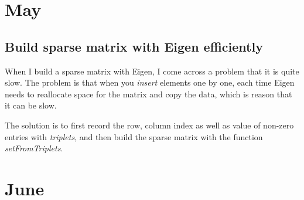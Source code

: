 \chapter{May}

\section{Build sparse matrix with Eigen efficiently} 

When I build a sparse matrix with Eigen, I come across a problem that it is quite slow. The problem is that
when you \textit{insert} elements one by one, each time Eigen needs to reallocate space for the matrix and copy
the data, which is reason that it can be slow. 

The solution is to first record the row, column index as well as value of non-zero entries with \textit{triplets},
and then build the sparse matrix with the function \textit{setFromTriplets}.

\chapter{June}
